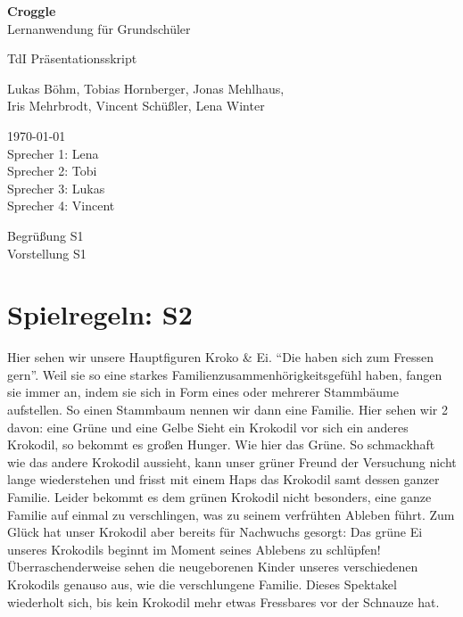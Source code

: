 \documentclass{scrartcl}
\begin{document}
	\begin{titlepage}
		\begin{center}
			{\huge \bfseries Croggle}\\[0.1cm]
			{\large  Lernanwendung für Grundschüler}
		\end{center}


		\begin{center}
			{\Large TdI Präsentationsskript}\\[0.5cm]
		\end{center}
		\begin{center}
			{Lukas Böhm, Tobias Hornberger, Jonas Mehlhaus, \\ Iris Mehrbrodt, Vincent Schüßler, Lena Winter} \\[1cm]
		\end{center}

		\begin{center}
			{\large \today \\
				Sprecher 1: Lena \\
				Sprecher 2:	Tobi \\
				Sprecher 3: Lukas \\
				Sprecher 4: Vincent
			}
		\end{center}
	\end{titlepage}

	Begrüßung		S1  \\
	Vorstellung		S1		
	\section{Spielregeln: S2} 
	Hier sehen wir unsere Hauptfiguren Kroko \& Ei.
	"`Die haben sich zum Fressen gern"'.
	Weil sie so eine starkes Familienzusammenhörigkeitsgefühl haben, fangen sie immer an, indem sie sich in Form eines oder mehrerer Stammbäume aufstellen.
	So einen Stammbaum nennen wir dann eine Familie.
	Hier sehen wir 2 davon: eine Grüne und eine Gelbe	
	Sieht ein Krokodil vor sich ein anderes Krokodil, so bekommt es großen Hunger. Wie hier das Grüne. So schmackhaft wie das andere Krokodil aussieht, kann unser grüner Freund der Versuchung nicht lange wiederstehen und frisst mit einem Haps das Krokodil samt dessen ganzer Familie.
	Leider bekommt es dem grünen Krokodil nicht besonders, eine ganze Familie auf einmal zu verschlingen, was zu seinem verfrühten Ableben führt.
	Zum Glück hat unser Krokodil aber bereits für Nachwuchs gesorgt: Das grüne Ei unseres Krokodils beginnt im Moment seines Ablebens zu schlüpfen!
	Überraschenderweise sehen die neugeborenen Kinder unseres verschiedenen Krokodils genauso aus, wie die verschlungene Familie.
	Dieses Spektakel wiederholt sich, bis kein Krokodil mehr etwas Fressbares vor der Schnauze hat.
\end{document}
